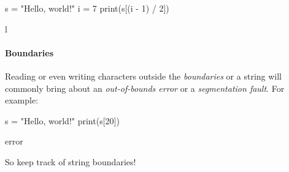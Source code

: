 \begin{minipage}[t]{0.5\textwidth}
\begin{listing}
s = "Hello, world!"
i = 7
print(s[(i - 1) / 2])
\end{listing}
\end{minipage}
\begin{minipage}[t]{0.5\textwidth}
\begin{listing}
l
\end{listing}
\end{minipage}

\paragraph{Boundaries}

Reading or even writing characters outside the \emph{boundaries} or a string will commonly bring about an \emph{out-of-bounds error} or a \emph{segmentation fault}. For example:

\begin{minipage}[t]{0.5\textwidth}
\begin{listing}
s = "Hello, world!"
print(s[20])
\end{listing}
\end{minipage}
\begin{minipage}[t]{0.5\textwidth}
\begin{listing}
error
\end{listing}
\end{minipage}

So keep track of string boundaries!
